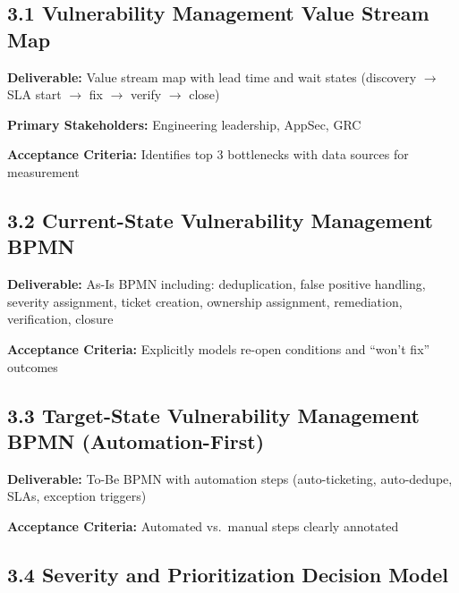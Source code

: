 \documentclass[11pt,letterpaper]{article}
\newcommand{\storyfield}[2]{\textbf{#1:} #2}
\begin{document}
\subsection{3.1 Vulnerability Management Value Stream Map}

\begin{storycard}
\storyfield{Deliverable}{Value stream map with lead time and wait states (discovery $\rightarrow$ SLA start $\rightarrow$ fix $\rightarrow$ verify $\rightarrow$ close)}

\storyfield{Primary Stakeholders}{Engineering leadership, AppSec, GRC}

\storyfield{Acceptance Criteria}{Identifies top 3 bottlenecks with data sources for measurement}
\end{storycard}

\subsection{3.2 Current-State Vulnerability Management BPMN}

\begin{storycard}
\storyfield{Deliverable}{As-Is BPMN including: deduplication, false positive handling, severity assignment, ticket creation, ownership assignment, remediation, verification, closure}

\storyfield{Acceptance Criteria}{Explicitly models re-open conditions and ``won't fix'' outcomes}
\end{storycard}

\subsection{3.3 Target-State Vulnerability Management BPMN (Automation-First)}

\begin{storycard}
\storyfield{Deliverable}{To-Be BPMN with automation steps (auto-ticketing, auto-dedupe, SLAs, exception triggers)}

\storyfield{Acceptance Criteria}{Automated vs.\ manual steps clearly annotated}
\end{storycard}

\subsection{3.4 Severity and Prioritization Decision Model}
\end{document}
